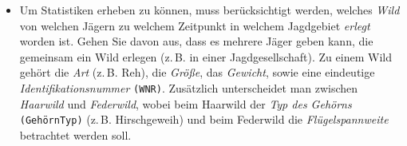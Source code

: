 \documentclass{article}
\begin{document}
\begin{itemize}
\item Um Statistiken erheben zu können, muss berücksichtigt werden,
welches \emph{Wild} von welchen Jägern zu welchem Zeitpunkt in
welchem Jagdgebiet \emph{erlegt} worden ist. Gehen Sie davon
aus, dass es mehrere Jäger geben kann, die gemeinsam ein Wild erlegen
(z.\,B. in einer Jagdgesellschaft). Zu einem Wild gehört die
\emph{Art} (z.\,B. Reh), die \emph{Größe}, das
\emph{Gewicht}, sowie eine eindeutige
\emph{Identifikationsnummer} \texttt{(WNR)}. Zusätzlich
unterscheidet man zwischen \emph{Haarwild} und \emph{Federwild},
wobei beim Haarwild der \emph{Typ des Gehörns}
\texttt{(GehörnTyp)} (z.\,B. Hirschgeweih) und beim Federwild die
\emph{Flügelspannweite} betrachtet werden soll.
\end{itemize}

\newpage
\end{document}
